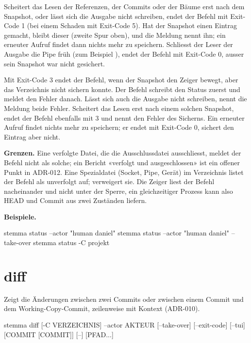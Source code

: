 Scheitert das Lesen der Referenzen, der Commits oder der Bäume erst nach dem Snapshot,
oder lässt sich die Ausgabe nicht schreiben, endet der Befehl mit Exit-Code 1
(bei einem Schaden mit Exit-Code 5).
Hat der Snapshot einen Eintrag gemacht, bleibt dieser (zweite Spur oben),
und die Meldung nennt ihn; ein erneuter Aufruf findet dann nichts mehr zu speichern.
Schliesst der Leser der Ausgabe die Pipe früh (zum Beispiel ),
endet der Befehl mit Exit-Code 0, ausser sein Snapshot war nicht gesichert.

Mit Exit-Code 3 endet der Befehl, wenn der Snapshot den Zeiger bewegt,
aber das Verzeichnis nicht sichern konnte.
Der Befehl schreibt den Status zuerst und meldet den Fehler danach.
Lässt sich auch die Ausgabe nicht schreiben, nennt die Meldung beide Fehler.
Scheitert das Lesen erst nach einem solchen Snapshot, endet der Befehl ebenfalls mit 3
und nennt den Fehler des Sicherns.
Ein erneuter Aufruf findet nichts mehr zu speichern; er endet mit Exit-Code 0,
sichert den Eintrag aber nicht.

{\bf Grenzen.} Eine verfolgte Datei, die die Ausschlussdatei ausschliesst,
meldet der Befehl nicht als solche; ein Bericht «verfolgt und ausgeschlossen»
ist ein offener Punkt in ADR-012.
Eine Spezialdatei (Socket, Pipe, Gerät) im Verzeichnis listet der Befehl als unverfolgt auf;
 verweigert sie.
Die Zeiger liest der Befehl nacheinander und nicht unter der Sperre,
ein gleichzeitiger Prozess kann also HEAD und Commit aus zwei Zuständen liefern.

{\bf Beispiele.}

\starttyping
stemma status --actor "human daniel"
stemma status --actor "human daniel" --take-over
stemma status -C projekt
\stoptyping

\section{diff}

Zeigt die Änderungen zwischen zwei Commits oder zwischen einem Commit und dem
Working-Copy-Commit, zeilenweise mit Kontext (ADR-010).

\starttyping
stemma diff [-C VERZEICHNIS] --actor AKTEUR [--take-over] [--exit-code] [--tui]
            [COMMIT [COMMIT]] [--] [PFAD...]
\stoptyping

